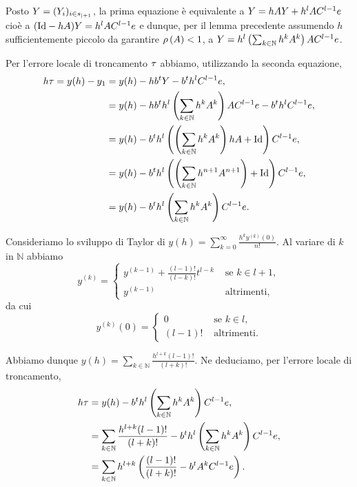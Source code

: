 \par Posto $Y = (Y_i)_{i \in {s}_{|+ 1}}$, la prima equazione \`e equivalente a $Y = h A Y + h^l A C^{l - 1} e$ cio\`e a $(\Identity - \Step A) Y = \Step^l A C^{l - 1} e$ e dunque, per il lemma precedente assumendo $h$ sufficientemente piccolo da garantire $\rho \left ( A \right ) < 1$, a $Y = h^{l} \left( \sum_{k \in \mathbb{N}} h^k A^k \right ) A C^{l - 1} e$.
\par Per l'errore locale di troncamento $\tau$ abbiamo, utilizzando la seconda equazione,
\begin{align*}
	\Step\LocalTruncationError = y(h) - y_1 &=y(h) - \Step \Transposed{b} Y - \Transposed{b} \Step^l C^{l - 1} e,\\
	&= y(h) - \Step \Transposed{b}\Step^l \left ( \sum_{k \in \mathbb{N}} \Step^k A^k \right ) A C^{l - 1} e - \Transposed{b} \Step^l C^{l - 1}e,\\
	&= y(h) - \Transposed{b}\Step^l \left ( \left ( \sum_{k \in \mathbb{N}} \Step^k A^k \right ) \Step A + \Identity \right ) C^{l - 1}e,\\
	&= y(h) - \Transposed{b}\Step^l \left ( \left ( \sum_{k \in \mathbb{N}} \Step^{n + 1} A^{n + 1} \right ) + \Identity \right ) C^{l - 1}e,\\
	&= y(h) - \Transposed{b}\Step^l \left ( \sum_{k \in \mathbb{N}} \Step^k A^k \right ) C^{l - 1}e.
\end{align*}
\par Consideriamo lo sviluppo di Taylor di $y(h) = \sum_{k = 0}^\infty \frac{h^k y^{(k)}(0)}{n!}$. Al variare di $k$ in $\mathbb{N}$ abbiamo
\[
y^{(k)} = \begin{cases}
y^{(k - 1)} + \frac{(l - 1)!}{(l - k)!}t^{l - k}&\text{ se }k \in l + 1,\\
y^{(k - 1)}&\text{ altrimenti},
\end{cases}
\]
da cui
\[
y^{(k)}(0) = \begin{cases}
0&\text{ se }k \in l,\\
(l - 1)!&\text{ altrimenti}.
\end{cases}
\]
\par Abbiamo dunque $y(h) = \sum_{k \in \mathbb{N}} \frac{h^{l + k} (l - 1)!}{(l + k)!}$. Ne deduciamo, per l'errore locale di troncamento,
\begin{align*}
	h\tau &= y(h) - {b}^th^l \left ( \sum_{k \in \mathbb{N}} h^k A^k \right ) C^{l - 1}e,\\
	&= \sum_{k \in \mathbb{N}} \frac{h^{l + k} (l - 1)!}{(l + k)!} - {b}^th^l \left ( \sum_{k \in \mathbb{N}} h^k A^k \right ) C^{l - 1}e,\\
	&= \sum_{k \in \mathbb{N}} h^{l + k} \left ( \frac{(l - 1)!}{(l + k)!} - {b}^t A^k C^{l - 1}e \right ).
\end{align*}
